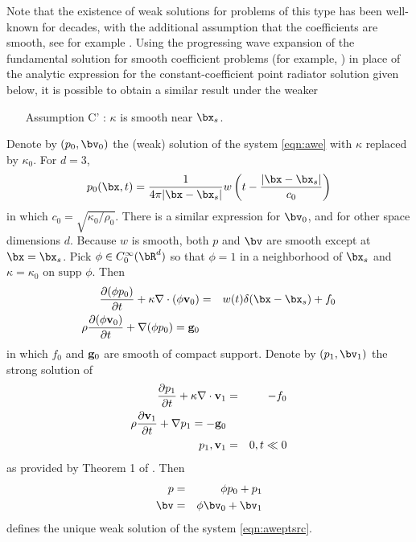 Note that the existence of weak solutions for problems of this type
has been 
well-known for decades, with the additional assumption that the coefficients are
smooth, see for example \cite{Lax:PDENotes}. Using the progressing
wave expansion of the fundamental solution for smooth coefficient
problems (for example, \cite{Friedlander:75}) in place of the analytic
expression for the constant-coefficient point radiator solution given
below, it is possible to obtain a similar result under the weaker
\begin{itemize}
\item[Assumption C']: $\kappa$ is smooth near $\bx_s$.
\end{itemize}

Denote by $(p_0,\bv_0)$ the (weak) solution of the
system \ref{eqn:awe} with $\kappa$ replaced by $\kappa_0$. For $d=3$,
\[
 p_0(\bx,t) = \frac{1}{4\pi |\bx-\bx_s|}w\left(t-\frac{ |\bx-\bx_s|}{c_0}\right)
\]
in which $c_0=\sqrt{\kappa_0/\rho_0}$. There is a similar expression
for $\bv_0$, and for other space dimensions $d$. Because $w$ is smooth, both $p$ and $\bv$ are smooth
except at $\bx=\bx_s$. Pick $\phi \in C_0^{\infty}(\bR^d)$ so that
$\phi = 1$ in a neighborhood of $\bx_s$ and $\kappa=\kappa_0$ on
$\mbox{supp }\phi$. Then
\begin{eqnarray}
\label{eqn:awecut}
\frac{\partial (\phi p_0)}{\partial t} + \kappa \nabla \cdot (\phi {\bf v}_0) &=&
                           w(t)\delta(\bx-\bx_s) + f_0  \nonumber\\
\rho \frac{\partial (\phi {\bf v}_0)}{\partial t} + \nabla (\phi p_0) = {\bf g}_0 \nonumber\\
\end{eqnarray}
in which $f_0$ and ${\bf g}_0$ are smooth of compact support. Denote by
$(p_1,\bv_1)$ the strong solution of
\begin{eqnarray}
\label{eqn:awesupp}
\frac{\partial p_1}{\partial t} + \kappa \nabla \cdot {\bf v}_1 &=&
                                                                -f_0 \nonumber\\
\rho \frac{\partial {\bf v}_1}{\partial t} + \nabla p_1 = -{\bf g}_0 \nonumber\\
p_1,{\bf v}_1&=&0, t \ll 0
\end{eqnarray}
as provided by Theorem 1 of \cite{BlazekStolkSymes:13}. Then
\begin{eqnarray*}
  p & = & \phi p_0 + p_1\\
  \bv & = & \phi \bv_0 + \bv_1
\end{eqnarray*}
defines the unique weak solution of the system \ref{eqn:aweptsrc}.

